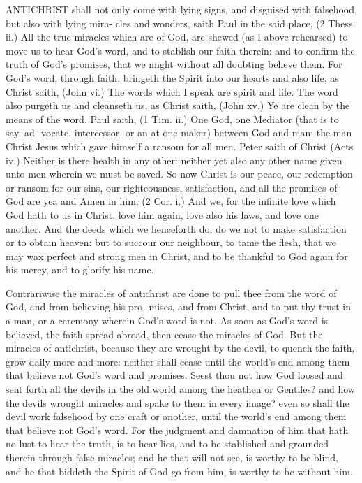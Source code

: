 \documentclass{custom}
\begin{document}
ANTICHRIST shall not only come with lying signs,
and disguised with falsehood, but also with lying mira-
cles and wonders, saith Paul in the said place, (2 Thess. 
ii.) All the true miracles which are of God, are shewed (as 
I above rehearsed) to move us to hear God's word, and to 
stablish our faith therein: and to confirm the truth of 
God's promises, that we might without all doubting believe 
them. For God's word, through faith, bringeth the Spirit 
into our hearts and also life, as Christ saith, (John vi.) 
The words which I speak are spirit and life. The word 
also purgeth us and cleanseth us, as Christ saith, (John 
xv.) Ye are clean by the means of the word. Paul saith, 
(1 Tim. ii.) One God, one Mediator (that is to say, ad- 
vocate, intercessor, or an at-one-maker) between God and 
man: the man Christ Jesus which gave himself a ransom 
for all men. Peter saith of Christ (Acts iv.) Neither is there 
health in any other: neither yet also any other name 
given unto men wherein we must be saved. So now 
Christ is our peace, our redemption or ransom for our sins, 
our righteousness, satisfaction, and all the promises of God 
are yea and Amen in him; (2 Cor. i.) And we, for the 
infinite love which God hath to us in Christ, love him 
again, love also his laws, and love one another. And the
deeds which we henceforth do, do we not to make satisfaction
or to obtain heaven: but to succour our neighbour, to
tame the flesh, that we may wax perfect and strong men 
in Christ, and to be thankful to God again for his mercy, 
and to glorify his name. 

Contrariwise the miracles of antichrist are done to
pull thee from the word of God, and from believing his pro-
mises, and from Christ, and to put thy trust in a man, or a
ceremony wherein God's word is not. As soon as God's word 
is believed, the faith spread abroad, then cease the miracles 
of God. But the miracles of antichrist, because they are 
wrought by the devil, to quench the faith, grow daily more 
and more: neither shall cease until the world's end among 
them that believe not God's word and promises. Seest 
thou not how God loosed and sent forth all the devils in 
the old world among the heathen or Gentiles? and how 
the devils wrought miracles and spake to them in every 
image? even so shall the devil work falsehood by one craft 
or another, until the world's end among them that believe 
not God's word. For the judgment and damnation of him 
that hath no lust to hear the truth, is to hear lies, and to 
be stablished and grounded therein through false miracles; 
and he that will not see, is worthy to be blind, and he that
biddeth the Spirit of God go from him, is worthy to be 
without him. 
\end{document}

